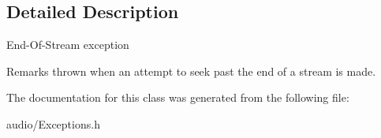 \subsection{Detailed Description}
End-\/\+Of-\/\+Stream exception \begin{DoxyRemark}{Remarks}
thrown when an attempt to seek past the end of a stream is made. 
\end{DoxyRemark}


The documentation for this class was generated from the following file\+:\begin{DoxyCompactItemize}
\item 
audio/Exceptions.\+h\end{DoxyCompactItemize}

